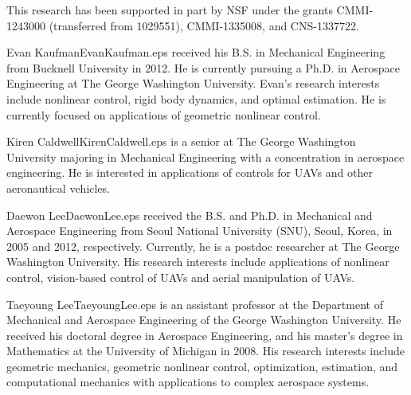 \documentclass[twocolumn,letterpaper]{IEEEAerospaceCLS}  %
\begin{document}
This research has been supported in part by NSF under the grants CMMI-1243000 (transferred from 1029551), CMMI-1335008, and CNS-1337722.

		
		



\thebiography

\begin{biographywithpic}
{Evan Kaufman}{EvanKaufman.eps}
received his B.S. in Mechanical Engineering from Bucknell University in 2012. He is currently pursuing a Ph.D. in Aerospace Engineering at The George Washington University. Evan's research interests include nonlinear control, rigid body dynamics, and optimal estimation. He is currently focused on applications of geometric nonlinear control.
\end{biographywithpic}

\begin{biographywithpic}
{Kiren Caldwell}{KirenCaldwell.eps}
is a senior at The George Washington University majoring in Mechanical Engineering with a concentration in aerospace engineering. He is interested in applications of controls for UAVs and other aeronautical vehicles.
\end{biographywithpic}

\vspace{20pt}

\begin{biographywithpic}
{Daewon Lee}{DaewonLee.eps}
received the B.S. and Ph.D. in Mechanical and Aerospace Engineering from Seoul National University (SNU), Seoul, Korea, in 2005 and 2012, respectively. Currently, he is a postdoc researcher at The George Washington University. His research interests include applications of nonlinear control, vision-based control of UAVs and aerial manipulation of UAVs.
\end{biographywithpic}

\begin{biographywithpic}
{Taeyoung Lee}{TaeyoungLee.eps}
is an assistant professor at the Department of Mechanical and Aerospace Engineering of the George Washington University. He received his doctoral degree in
Aerospace Engineering, and his master's degree in Mathematics at the University of Michigan in 2008. His research interests include geometric mechanics, geometric nonlinear control, optimization, estimation, and computational mechanics with applications to complex aerospace systems.
\end{biographywithpic}
\end{document}
